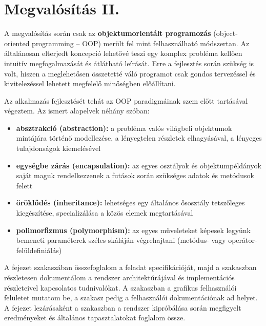 \chapter{Megvalósítás II.}\label{sect:megvalositas_2}

A megvalósítás során csak az \textbf{objektumorientált programozás} (object-oriented programming -- OOP) merült fel mint felhasználható módszertan. Az általánosan elterjedt koncepció lehetővé teszi egy komplex probléma kellően intuitív megfogalmazását és átlátható leírását. Erre a fejlesztés során szükség is volt, hiszen a meglehetősen összetetté váló programot csak gondos tervezéssel és kivitelezéssel lehetett megfelelő minőségben előállítani.

Az alkalmazás fejlesztését tehát az OOP paradigmáinak szem előtt tartásával végeztem. Az ismert alapelvek néhány szóban:

\begin{itemize}
  \item \textbf{absztrakció (abstraction):} a probléma valós világbeli objektumok mintájára történő modellezése, a lényegtelen részletek elhagyásával, a lényeges tulajdonságok kiemelésével
  \item \textbf{egységbe zárás (encapsulation):} az egyes osztályok és objektumpéldányok saját maguk rendelkezzenek a futások során szükséges adatok és metódusok felett
  \item \textbf{öröklődés (inheritance):} lehetséges egy általános ősosztály tetszőleges kiegészítése, specializálása a közös elemek megtartásával
  \item \textbf{polimorfizmus (polymorphism):} az egyes műveleteket képesek legyünk bemeneti paraméterek széles skáláján végrehajtani (metódus- vagy operátor-felüldefiniálás)
\end{itemize}

A fejezet  szakaszában összefoglalom a feladat specifikációját, majd a  szakaszban részletesen dokumentálom a rendszer architektúrájával és implementációs részleteivel kapcsolatos tudnivalókat. A  szakaszban a grafikus felhasználói felületet mutatom be, a  szakasz pedig a felhasználói dokumentációnak ad helyet. A fejezet lezárásaként a  szakaszban a rendszer kipróbálása során megfigyelt eredményeket és általános tapasztalatokat foglalom össze.

